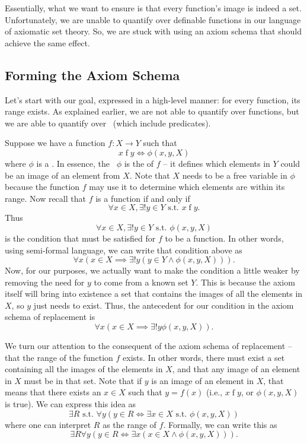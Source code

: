 Essentially, what we want to ensure is that every function's image is indeed a set. Unfortunately, we are unable to quantify over definable functions in our language of axiomatic set theory. So, we are stuck with using an axiom schema that should achieve the same effect.

\subsection{Forming the Axiom Schema}
Let's start with our goal, expressed in a high-level manner: for every function, its range exists. As explained earlier, we are not able to quantify over functions, but we are able to quantify over \wffs~(which include predicates).

Suppose we have a function $f: X \to Y$ such that
\[
    x \mathrel{f} y \iff \phi(x, y, X)
\]
where $\phi$ is a \wff. In essence, the \wff~$\phi$ is the  of $f$ -- it defines which elements in $Y$ could be an image of an element from $X$. Note that $X$ needs to be a free variable in $\phi$ because the function $f$ may use it to determine which elements are within its range. Now recall that $f$ is a function if and only if
\[
    \forall x \in X, \exists! y \in Y \text{ s.t. } x \mathrel{f} y.
\]
Thus
\[
    \forall x \in X, \exists! y \in Y \text{ s.t. } \phi(x, y, X)
\]
is the condition that must be satisfied for $f$ to be a function. In other words, using semi-formal language, we can write that condition above as
\[
    \forall x (x \in X \implies \exists! y (y \in Y \land \phi(x, y, X))).
\]
Now, for our purposes, we actually want to make the condition a little weaker by removing the need for $y$ to come from a known set $Y$. This is because the axiom itself will bring into existence a set that contains the images of all the elements in $X$, so $y$ just needs to exist. Thus, the antecedent for our condition in the axiom schema of replacement is
\[
    \forall x (x \in X \implies \exists! y \phi(x, y, X)).
\]

We turn our attention to the consequent of the axiom schema of replacement -- that the range of the function $f$ exists. In other words, there must exist a set containing all the images of the elements in $X$, and that any image of an element in $X$ must be in that set. Note that if $y$ is an image of an element in $X$, that means that there exists an $x \in X$ such that $y = f(x)$ (i.e., $x \mathrel{f} y$, or $\phi(x, y, X)$ is true). We can express this idea as
\[
    \exists R \text{ s.t. } \forall y (y \in R \iff \exists x \in X \text{ s.t. } \phi(x, y, X))
\]
where one can interpret $R$ as the range of $f$. Formally, we can write this as
\[
    \exists R \forall y (y \in R \iff \exists x (x \in X \land \phi(x, y, X))).
\]

